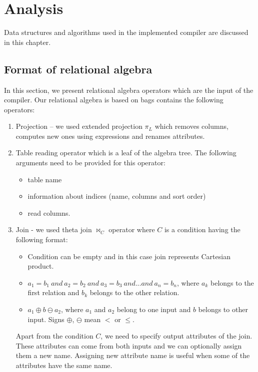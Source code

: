 \chapter{Analysis}
\label{analysis}
Data structures and algorithms used in the implemented compiler are discussed in this chapter.
\section{Format of relational algebra}

In this section, we present relational algebra operators which are the input of the compiler. Our relational algebra is based on bags contains the following operators:
\begin{enumerate}
\item Projection -- we used extended projection $\pi_L$ which removes columns, computes new ones using expressions and renames attributes.

\item Table reading operator which is a leaf of the algebra tree. The following arguments need to be provided for this operator:
\begin{itemize}
\item table name
\item information about indices (name, columns and sort order)
\item read columns.
\end{itemize}
\item Join - we used theta join $\Join_C$ operator where $C$ is a condition having the following format:
\begin{itemize}
\item Condition can be empty and in this case join represents Cartesian product.
\item $a_1=b_1~and~a_2=b_2~and~a_3=b_3~and...and~a_n=b_n$, where $a_k$ belongs to the first relation and $b_k$ belongs to the other relation.
\item $a_1\oplus b \ominus a_2$, where $a_1$ and $a_2$ belong to one input and $b$ belongs to other input. Signs $\oplus$, $\ominus$ mean $<$ or $\leq$.

\end{itemize}

Apart from the condition $C$, we need to specify output attributes of the join. These attributes can come from both inputs and we can optionally assign them a new name. Assigning new attribute name is useful when some of the attributes have the same name.


\end{enumerate}
